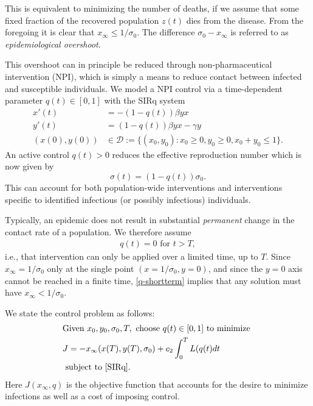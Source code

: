 \documentclass[english,12pt,letter]{article}
\newcommand{\Rnot}{\sigma_0}
\newcommand{\Sinf}{x_\infty}
\newcommand{\dom}{{\mathcal D}}
\begin{document}
This is equivalent to minimizing the number of deaths, if we assume that
some fixed fraction of the recovered population $z(t)$ dies from the disease.
From the foregoing it is clear that $\Sinf \le 1/\Rnot$.  The difference
$\Rnot-\Sinf$ is referred to as {\em epidemiological overshoot}.

This overshoot can in principle be reduced through
non-pharmaceutical intervention (NPI), which is simply a means to
reduce contact between infected and susceptible individuals.  We model a NPI
control via a time-dependent parameter $q(t)\in[0,1]$ with the SIRq system
\begin{subequations} \label{SIRq}
\begin{align}
    x'(t) & = -(1-q(t))\beta y x \\
    y'(t) & = (1-q(t))\beta y x - \gamma y \\
    (x(0),y(0)) & \in \dom := \{(x_0,y_0) : x_0 \ge 0, y_0\ge 0, x_0+y_0 \le 1\}.
\end{align}
\end{subequations}
An active control $q(t)>0$ reduces the effective reproduction number which is now
given by 
$$\sigma(t) = (1-q(t))\Rnot.$$
This can account for both
population-wide interventions and interventions specific to identified infectious
(or possibly infectious) individuals.  

Typically, an epidemic does not result in substantial {\em permanent} change in the contact rate of
a population.  We therefore assume 
\begin{align} \label{q-shortterm}
    q(t)=0 \text{ for } t>T,
\end{align}
i.e., that intervention can only be applied over a limited time, up to $T$.
Since $x_\infty=1/\sigma_0$ only at the single point $(x=1/\sigma_0,y=0)$, and since 
the $y=0$ axis cannot be reached in a finite time, \eqref{q-shortterm} implies
that any solution must have $x_\infty<1/\sigma_0$.

We state the control problem as follows:
\begin{align} \label{eq:basic-problem}
\begin{aligned}
& \text{Given } x_0, y_0, \sigma_0, T, \text{ choose } q(t) \in [0,1] \text{ to minimize }  \\
&     J = -x_\infty(x(T),y(T),\sigma_0) + c_2 \int_0^T L(q(t) dt \\
& \text{ subject to } \eqref{SIRq}.
\end{aligned}
\end{align}
Here $J(x_\infty,q)$ is the objective function that accounts for the desire to
minimize infections as well as a cost of imposing control.
\end{document}
